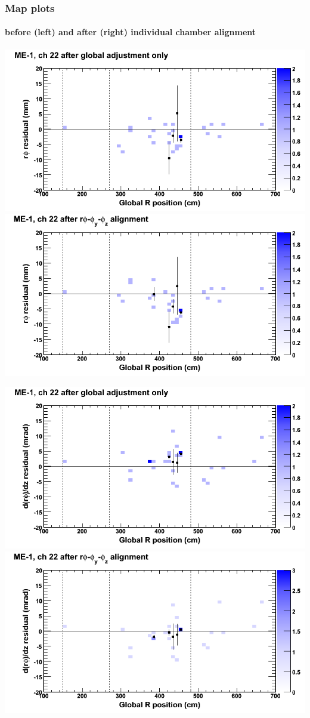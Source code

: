 \documentclass[compress]{beamer}
\begin{document}
\begin{frame}
\frametitle{Map plots}
\framesubtitle{before (left) and after (right) individual chamber alignment}
\includegraphics[width=0.5\linewidth]{ringmapplots_3dof/before_CSCvsr_mem1ch22_x.png} \includegraphics[width=0.5\linewidth]{ringmapplots_3dof/after_CSCvsr_mem1ch22_x.png}

\includegraphics[width=0.5\linewidth]{ringmapplots_3dof/before_CSCvsr_mem1ch22_dxdz.png} \includegraphics[width=0.5\linewidth]{ringmapplots_3dof/after_CSCvsr_mem1ch22_dxdz.png}
\end{frame}
\end{document}
